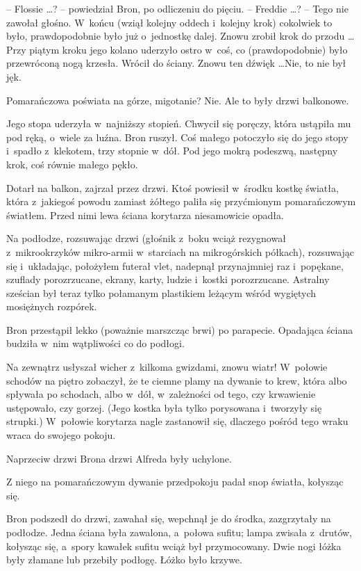 \documentclass[oneside,polish,11pt,rmheadings]{mwbk}
\begin{document}
-- Flossie \ldots ? -- powiedział Bron, po odliczeniu do pięciu. -- Freddie \ldots ? -- Tego nie zawołał głośno. W~końcu (wziął kolejny oddech i~kolejny krok) cokolwiek to było, prawdopodobnie było już o~jednostkę dalej. Znowu zrobił krok do przodu \ldots  Przy piątym kroku jego kolano uderzyło ostro w~coś, co (prawdopodobnie) było przewróconą nogą krzesła. Wrócił do ściany. Znowu ten dźwięk \ldots  Nie, to nie był jęk. 

Pomarańczowa poświata na górze, migotanie? Nie. Ale to były drzwi balkonowe. 

Jego stopa uderzyła w~najniższy stopień. Chwycił się poręczy, która ustąpiła mu pod ręką, o~wiele za luźna. Bron ruszył. Coś małego potoczyło się do jego stopy i~spadło z~klekotem, trzy stopnie w~dół. Pod jego mokrą podeszwą, następny krok, coś równie małego pękło. 

Dotarł na balkon, zajrzał przez drzwi. Ktoś powiesił w~środku kostkę światła, która z~jakiegoś powodu zamiast żółtego paliła się przyćmionym pomarańczowym światłem. Przed nimi lewa ściana korytarza niesamowicie opadła. 

Na podłodze, rozsuwając drzwi (głośnik z~boku wciąż rezygnował z~mikrookrzyków mikro-armii w~starciach na mikrogórskich półkach), rozsuwając się i~układając, położyłem futerał vlet,  nadepnął przynajmniej raz i~popękane, szuflady porozrzucane, ekrany, karty, ludzie i~kostki porozrzucane. Astralny sześcian był teraz tylko połamanym plastikiem leżącym wśród wygiętych mosiężnych rozpórek. 

Bron przestąpił lekko (poważnie marszcząc brwi) po parapecie. Opadająca ściana budziła w~nim wątpliwości co do podłogi. 

Na zewnątrz usłyszał wicher z~kilkoma gwizdami, znowu wiatr! W~połowie schodów na piętro zobaczył, że te ciemne plamy na dywanie to krew, która albo spływała po schodach, albo w~dół, w~zależności od tego, czy krwawienie ustępowało, czy gorzej. (Jego kostka była tylko porysowana i~tworzyły się strupki.) W~połowie korytarza nagle zastanowił się, dlaczego pośród tego wraku wraca do swojego pokoju. 

Naprzeciw drzwi Brona drzwi Alfreda były uchylone. 

Z niego na pomarańczowym dywanie przedpokoju padał snop światła, kołysząc się. 

Bron podszedł do drzwi, zawahał się, wepchnął je do środka, zazgrzytały na podłodze. Jedna ściana była zawalona, a~połowa sufitu; lampa zwisała z~drutów, kołysząc się, a~spory kawałek sufitu wciąż był przymocowany. Dwie nogi łóżka były złamane lub przebiły podłogę. Łóżko było krzywe. 
\end{document}
